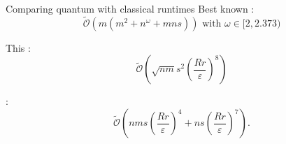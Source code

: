 \begin{frame}{Comparing quantum with classical runtimes}
Best known :
\begin{equation*}
\tilde{\mathcal{O}}(m(m^2+n^\omega+mns)) \text{ with } \omega\in[2,2.373)
\end{equation*}

\vspace{\floatsep}

This :
\begin{equation*}
\tilde{\mathcal{O}}\left(\sqrt{nm}s^2\left(\frac{Rr}{\varepsilon}\right)^8\right)
\end{equation*}

\vspace{\floatsep}

:
\begin{equation*}
 \tilde{\mathcal{O}}\left(nms \left(\frac{Rr}{\varepsilon}\right)^4 + ns \left(\frac{Rr}{\varepsilon}\right)^7 \right).
\end{equation*}

\end{frame}